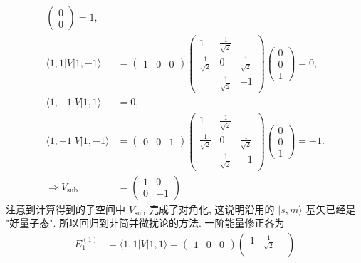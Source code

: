 \documentclass[../../main.tex]{subfiles}
\begin{document}
\begin{enumerate}
\begin{enumerate}
{{\begin{align*}
\begin{pmatrix}
          0\\
          0
       \end{pmatrix} = 1,\\
       \langle 1,1|V|1,-1\rangle &= \begin{pmatrix}
        1 & 0 & 0
      \end{pmatrix}\begin{pmatrix}
        1 & \frac{1}{\sqrt{2}}& \\
        \frac{1}{\sqrt{2}} & 0  & \frac{1}{\sqrt{2}}\\
          & \frac{1}{\sqrt{2}} & -1
       \end{pmatrix}\begin{pmatrix}
          0\\
          0\\
          1
        \end{pmatrix} = 0,\\
        \langle 1,-1|V|1,1\rangle &= 0,\\
        \langle 1,-1|V|1,-1\rangle &= \begin{pmatrix}
          0 & 0 & 1
        \end{pmatrix}\begin{pmatrix}
          1 & \frac{1}{\sqrt{2}}& \\
          \frac{1}{\sqrt{2}} & 0  & \frac{1}{\sqrt{2}}\\
            & \frac{1}{\sqrt{2}} & -1
         \end{pmatrix}\begin{pmatrix}
            0\\
            0\\
            1
         \end{pmatrix} = -1.\\
         \Rightarrow V_{\text{sub}} &= \begin{pmatrix}
          1 & 0\\
          0 & -1
         \end{pmatrix}
    \end{align*}
    注意到计算得到的子空间中 $V_{\text{sub}}$ 完成了对角化, 这说明沿用的 $|s,m\rangle$ 基矢已经是 "好量子态". 所以回归到非简并微扰论的方法. 一阶能量修正各为
    \begin{align*}
      E_{1}^{(1)} &= \langle 1,1|V|1,1\rangle = \begin{pmatrix}
        1 & 0 & 0
      \end{pmatrix}\begin{pmatrix}
        1 & \frac{1}{\sqrt{2}}& \\

\end{pmatrix}
\end{align*}}}
\end{enumerate}
\end{enumerate}
\end{document}
